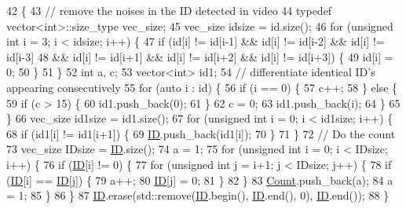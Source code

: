 \begin{DoxyCode}
42                                      \{
43   \textcolor{comment}{// remove the noises in the ID detected in video}
44   \textcolor{keyword}{typedef} vector<int>::size\_type vec\_size;
45   vec\_size idsize = \textcolor{keywordtype}{id}.size();
46   \textcolor{keywordflow}{for} (\textcolor{keywordtype}{unsigned} \textcolor{keywordtype}{int} i = 3; i < idsize; i++) \{
47     \textcolor{keywordflow}{if} (\textcolor{keywordtype}{id}[i] != \textcolor{keywordtype}{id}[i-1] && \textcolor{keywordtype}{id}[i] != \textcolor{keywordtype}{id}[i-2] && \textcolor{keywordtype}{id}[i] != \textcolor{keywordtype}{id}[i-3]
48        && \textcolor{keywordtype}{id}[i] != \textcolor{keywordtype}{id}[i+1] && \textcolor{keywordtype}{id}[i] != \textcolor{keywordtype}{id}[i+2] && \textcolor{keywordtype}{id}[i] != \textcolor{keywordtype}{id}[i+3]) \{
49        \textcolor{keywordtype}{id}[i] = 0;
50     \}
51   \}
52   \textcolor{keywordtype}{int} a, c;
53   vector<int> id1;
54   \textcolor{comment}{// differentiate identical ID's appearing consecutively}
55   \textcolor{keywordflow}{for} (\textcolor{keyword}{auto}  i : \textcolor{keywordtype}{id}) \{
56     \textcolor{keywordflow}{if} (i == 0) \{
57        c++;
58     \} \textcolor{keywordflow}{else} \{
59       \textcolor{keywordflow}{if} (c > 15) \{
60         id1.push\_back(0);
61       \}
62       c = 0;
63       id1.push\_back(i);
64     \}
65   \}
66   vec\_size id1size = id1.size();
67   \textcolor{keywordflow}{for} (\textcolor{keywordtype}{unsigned} \textcolor{keywordtype}{int} i = 0; i < id1size; i++) \{
68     \textcolor{keywordflow}{if} (id1[i] != id1[i+1]) \{
69        \hyperlink{classcountID_aa19098f252bab94e0c50937e5a189eb5}{ID}.push\_back(id1[i]);
70     \}
71   \}
72   \textcolor{comment}{// Do the count}
73   vec\_size IDsize = \hyperlink{classcountID_aa19098f252bab94e0c50937e5a189eb5}{ID}.size();
74   a = 1;
75   \textcolor{keywordflow}{for} (\textcolor{keywordtype}{unsigned} \textcolor{keywordtype}{int} i = 0; i < IDsize; i++) \{
76     \textcolor{keywordflow}{if} (\hyperlink{classcountID_aa19098f252bab94e0c50937e5a189eb5}{ID}[i] != 0) \{
77       \textcolor{keywordflow}{for} (\textcolor{keywordtype}{unsigned} \textcolor{keywordtype}{int} j = i+1; j < IDsize; j++) \{
78         \textcolor{keywordflow}{if} (\hyperlink{classcountID_aa19098f252bab94e0c50937e5a189eb5}{ID}[i] == \hyperlink{classcountID_aa19098f252bab94e0c50937e5a189eb5}{ID}[j]) \{
79           a++;
80           \hyperlink{classcountID_aa19098f252bab94e0c50937e5a189eb5}{ID}[j] = 0;
81         \}
82       \}
83       \hyperlink{classcountID_ab579fb8cf43eaaf5e56ff9efec53be7b}{Count}.push\_back(a);
84       a = 1;
85     \}
86   \}
87   \hyperlink{classcountID_aa19098f252bab94e0c50937e5a189eb5}{ID}.erase(std::remove(\hyperlink{classcountID_aa19098f252bab94e0c50937e5a189eb5}{ID}.begin(), \hyperlink{classcountID_aa19098f252bab94e0c50937e5a189eb5}{ID}.end(), 0), \hyperlink{classcountID_aa19098f252bab94e0c50937e5a189eb5}{ID}.end());
88 \}
\end{DoxyCode}


